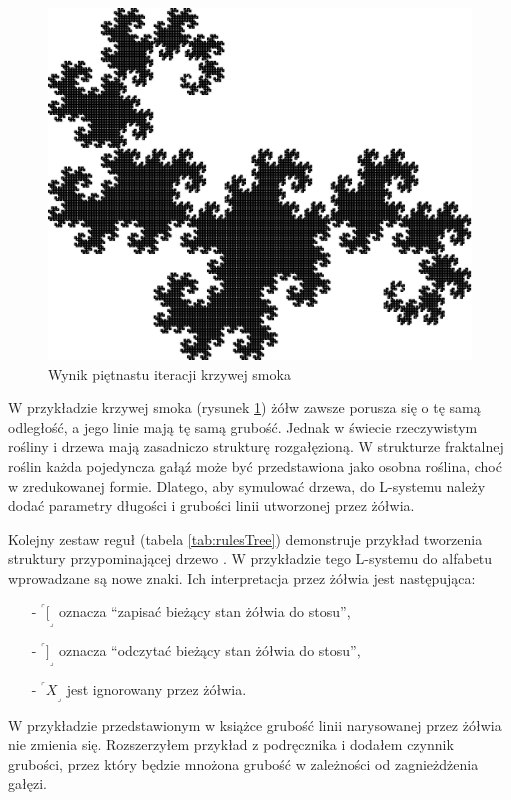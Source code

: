 \documentclass[a4paper,12pt,twoside]{book} %
\def\crnrs#1{$^\ulcorner#1_\lrcorner$}
\begin{document}
\begin{figure}[H]
	\centering
	\includegraphics[scale=0.8]{grafika/example152}
	\caption{Wynik piętnastu iteracji krzywej smoka}
	\label{fig:dragoncurve}
\end{figure}

W przykładzie krzywej smoka (rysunek \ref{fig:dragoncurve}) żółw zawsze
porusza się o tę samą odległość, a jego linie mają tę samą grubość.
Jednak w świecie rzeczywistym rośliny
i drzewa mają zasadniczo strukturę rozgałęzioną. W strukturze fraktalnej
roślin każda pojedyncza gałąź może być przedstawiona jako osobna roślina,
choć w zredukowanej formie. Dlatego, aby symulować drzewa, do L-systemu 
należy dodać parametry długości i grubości linii utworzonej przez 
żółwia. 

Kolejny zestaw reguł (tabela \ref{tab:rulesTree}) demonstruje przykład tworzenia struktury 
przypominającej drzewo \cite{beautyofplants}.
W przykładzie tego L-systemu do alfabetu wprowadzane są nowe znaki. 
Ich interpretacja przez żółwia jest następująca:

\begin{itemize}
	\item[-] \crnrs{[} oznacza ``zapisać bieżący stan żółwia do stosu'',
	\item[-] \crnrs{]} oznacza ``odczytać bieżący stan żółwia do stosu'',
	\item[-] \crnrs{X} jest ignorowany przez żółwia.
\end{itemize}

W przykładzie przedstawionym w książce \cite{beautyofplants} grubość linii narysowanej
przez żółwia nie zmienia się. Rozszerzyłem przykład z podręcznika
i dodałem czynnik grubości, przez który będzie mnożona grubość 
w zależności od zagnieżdżenia gałęzi. 
\end{document}
